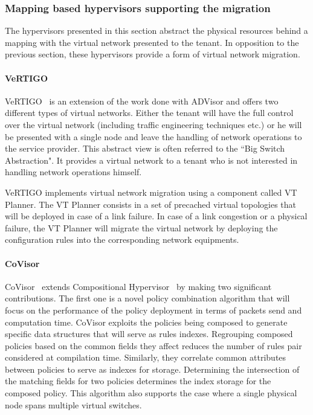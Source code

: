 \subsubsection{Mapping based hypervisors supporting the migration}
The hypervisors presented in this section abstract the physical resources behind a mapping with the virtual network presented to the tenant. In opposition to the previous section, these hypervisors provide a form of virtual network migration. 

\paragraph{VeRTIGO}
VeRTIGO~\cite{VeRTIGO-Corin2012a} is an extension of the work done with ADVisor and offers two different types of virtual networks.
Either the tenant will have the full control over the virtual network (including traffic engineering techniques etc.) or he will be presented with a single node and leave the handling of network operations to the service provider.
This abstract view is often referred to the ``Big Switch Abstraction".
It provides a virtual network to a tenant who is not interested in handling network operations himself.

VeRTIGO implements virtual network migration using a component called VT Planner. The VT Planner consists in a set of precached virtual topologies that will be deployed in case of a link failure. In case of a link congestion or a physical failure, the VT Planner will migrate the virtual network by deploying the configuration rules into the corresponding network equipments.

\paragraph{CoVisor}
CoVisor~\cite{CoVisor-Jin2015} extends Compositional Hypervisor~\cite{CompositionalHypervisor-Jin2014} by making two significant contributions.
The first one is a novel policy combination algorithm that will focus on the performance of the policy deployment in terms of packets send and computation time.
CoVisor exploits the policies being composed to generate specific data structures that will serve as rules indexes.
Regrouping composed policies based on the common fields they affect reduces the number of rules pair considered at compilation time.
Similarly, they correlate common attributes between policies to serve as indexes for storage. Determining the intersection of the matching fields for two policies determines the index storage for the composed policy.
This algorithm also supports the case where a single physical node spans multiple virtual switches.

